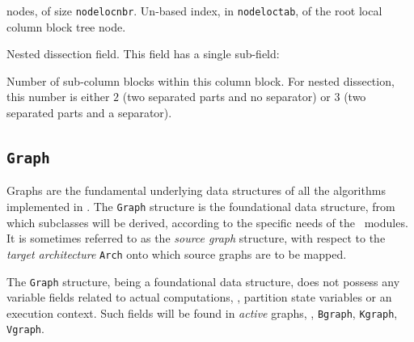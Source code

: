 \begin{itemize}
\begin{itemize}
\begin{itemize}
      nodes, of size \texttt{node\lbt loc\lbt nbr}.
      Un-based index, in \texttt{node\lbt loc\lbt tab}, of the root
      local column block tree node.
    \end{itemize}
    Nested dissection field. This field has a single sub-field:
    \begin{itemize}
      Number of sub-column blocks within this column block. For nested
      dissection, this number is either $2$ (two separated parts and
      no separator) or $3$ (two separated parts and a separator).
    \end{itemize}
  \end{itemize}
\end{itemize}

\subsection{\texttt{Graph}}
\label{sec-data-graph}

Graphs are the fundamental underlying data structures of all the
algorithms implemented in \scotch. The \texttt{Graph} structure is the
foundational data structure, from which subclasses will be derived,
according to the specific needs of the \scotch\ modules. It is
sometimes referred to as the \textit{source graph} structure, with
respect to the \textit{target architecture} \texttt{Arch} onto which
source graphs are to be mapped.

The \texttt{Graph} structure, being a foundational data structure,
does not possess any variable fields related to actual computations,
\eg, partition state variables or an execution context. Such fields
will be found in \textit{active} graphs, \eg, \texttt{Bgraph},
\texttt{Kgraph}, \texttt{Vgraph}.

